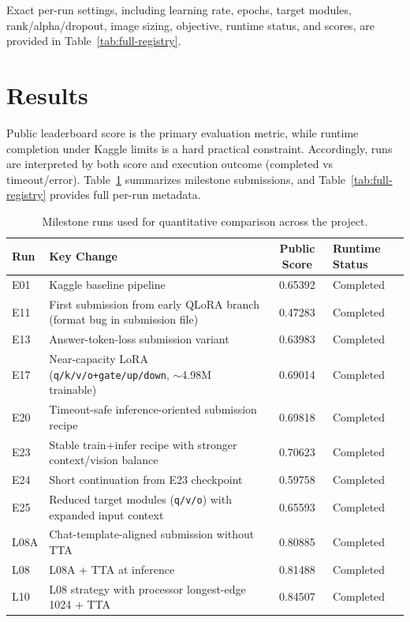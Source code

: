 \documentclass[11pt]{article}
\begin{document}
Exact per-run settings, including learning rate, epochs, target modules, rank/alpha/dropout, image sizing, objective, runtime status, and scores, are provided in Table~\ref{tab:full-registry}.



\section{Results}
Public leaderboard score is the primary evaluation metric, while runtime completion under Kaggle limits is a hard practical constraint. Accordingly, runs are interpreted by both score and execution outcome (completed vs timeout/error). Table~\ref{tab:result-milestones} summarizes milestone submissions, and Table~\ref{tab:full-registry} provides full per-run metadata.

\begin{table}[t]
\centering
\small
\setlength{\tabcolsep}{4pt}
\begin{tabular}{l p{6.6cm} c l}
\hline
Run & Key Change & Public Score & Runtime Status \\
\hline
E01 & Kaggle baseline pipeline & 0.65392 & Completed \\
E11 & First submission from early QLoRA branch (format bug in submission file) & 0.47283 & Completed \\
E13 & Answer-token-loss submission variant & 0.63983 & Completed \\
E17 & Near-capacity LoRA (\texttt{q/k/v/o+gate/up/down}, $\sim$4.98M trainable) & 0.69014 & Completed \\
E20 & Timeout-safe inference-oriented submission recipe & 0.69818 & Completed \\
E23 & Stable train+infer recipe with stronger context/vision balance & 0.70623 & Completed \\
E24 & Short continuation from E23 checkpoint & 0.59758 & Completed \\
E25 & Reduced target modules (\texttt{q/v/o}) with expanded input context & 0.65593 & Completed \\
L08A & Chat-template-aligned submission without TTA & 0.80885 & Completed \\
L08 & L08A + TTA at inference & 0.81488 & Completed \\
L10 & L08 strategy with processor longest-edge 1024 + TTA & 0.84507 & Completed \\
\hline
\end{tabular}
\caption{Milestone runs used for quantitative comparison across the project.}
\label{tab:result-milestones}
\end{table}
\end{document}
